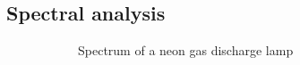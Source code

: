 \documentclass{scrartcl}
\begin{document}
\newpage
\subsection{Spectral analysis}

\begin{figure}[!ht]
    \centering
    \begin{subfigure}[b]{0.49\textwidth}
      \centering
      \caption{Spectrum of a neon gas discharge lamp}
      \label{fig:neonLamp}
    \end{subfigure}
    \hfill
    \begin{subfigure}[b]{0.49\textwidth}
      \centering

\end{subfigure}
\end{figure}
\end{document}
